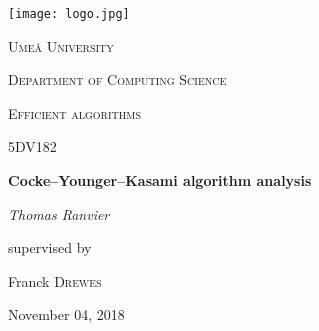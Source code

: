 \begin{titlepage}
    \centering
    \texttt{[image: logo.jpg]} \par\vspace{1cm}
    {\scshape\LARGE Umeå University \par}
    {\scshape\Large Department of Computing Science\par}
    \vspace{1cm}
    {\scshape\Large Efficient algorithms\par}
    {\scshape\large 5DV182\par}
    \vspace{1.5cm}
    {\huge\bfseries Cocke–Younger–Kasami algorithm analysis\par}
    \vspace{2cm}
    {\Large\itshape Thomas Ranvier\par}
    \vfill 
    {\large supervised by\par}
    Franck \textsc{Drewes}
    \vfill 
    {\large November 04, 2018\par}
\end{titlepage}
